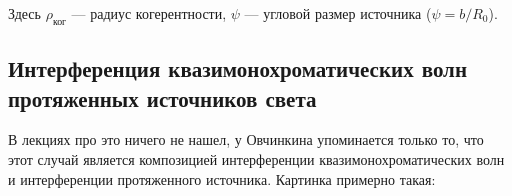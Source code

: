 Здесь $\rho_{\text{ког}}$ --- радиус когерентности, $\psi$ --- угловой размер источника ($\psi = b / R_0$).

\subsection{Интерференция квазимонохроматических волн протяженных источников света}

В лекциях про это ничего не нашел, у Овчинкина упоминается только то, что этот случай является композицией интерференции квазимонохроматических волн и интерференции протяженного источника. Картинка примерно такая: %